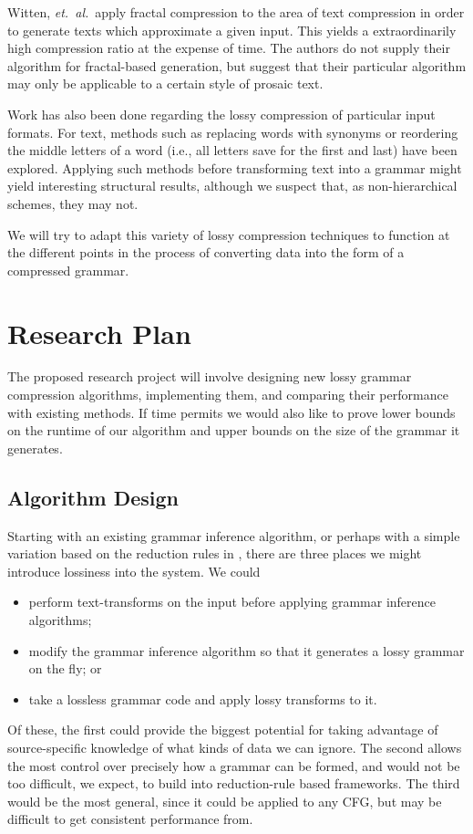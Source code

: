 \documentclass[11pt]{article}
\begin{document}
Witten, \emph{et.\ al.}\ apply fractal compression to the area of text
compression in order to generate texts which approximate a given input.  This
yields a extraordinarily high compression ratio at the expense of time.  The
authors do not supply their algorithm for fractal-based generation, but suggest
that their particular algorithm may only be applicable to a certain style of
prosaic text.

Work has also been done regarding the lossy compression of particular input
formats.  For text, methods such as replacing words with synonyms
\cite{semanticlossy} or reordering the middle letters of a word (i.e., all
letters save for the first and last) \cite{semilossless} have been explored.
Applying such methods before transforming text into a grammar might yield
interesting structural results, although we suspect that, as non-hierarchical
schemes, they may not.

We will try to adapt this variety of lossy compression techniques to function
at the different points in the process of converting data into the form of a
compressed grammar.

\section{Research Plan}

The proposed research project will involve designing new lossy grammar
compression algorithms, implementing them, and comparing their performance with
existing methods.  If time permits we would also like to prove lower bounds on
the runtime of our algorithm and upper bounds on the size of the grammar it
generates.

\subsection{Algorithm Design}

Starting with an existing grammar inference algorithm, or perhaps with a simple
variation based on the reduction rules in \cite{grammarcodes}, there are three
places we might introduce lossiness into the system.  We could
\begin{itemize}
  \item perform text-transforms on the input before applying grammar
    inference algorithms;
  \item modify the grammar inference algorithm so that it generates a lossy
    grammar on the fly; or
  \item take a lossless grammar code and apply lossy transforms to it.
\end{itemize}
Of these, the first could provide the biggest potential for taking advantage of
source-specific knowledge of what kinds of data we can ignore.  The second
allows the most control over precisely how a grammar can be formed, and would
not be too difficult, we expect, to build into reduction-rule based frameworks.
The third would be the most general, since it could be applied to any CFG, but
may be difficult to get consistent performance from.
\end{document}
